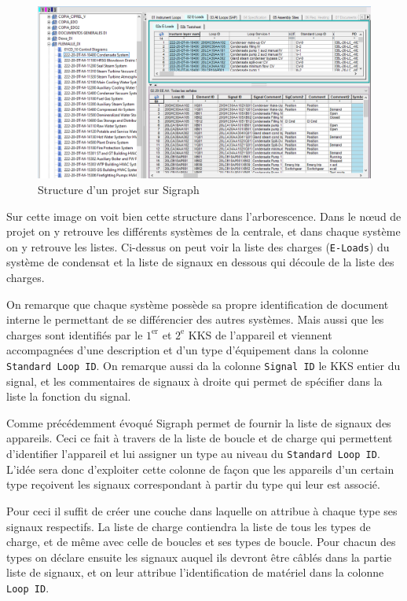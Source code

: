 \documentclass[11pt, openright]{book}
\begin{document}

\begin{figure}[ht!]
    \centering
    \includegraphics[width=\textwidth]{./object/Sigraph.png}
    \caption{Structure d'un projet sur Sigraph}
    \label{fig:Sigraph}
\end{figure}

Sur cette image on voit bien cette structure dans l'arborescence. Dans le nœud de projet on y retrouve les différents systèmes de la centrale, et dans chaque système on y retrouve les listes. Ci-dessus on peut voir la liste des charges (\texttt{E-Loads}) du système de condensat et la liste de signaux en dessous qui découle de la liste des charges.

On remarque que chaque système possède sa propre identification de document interne le permettant de se différencier des autres systèmes. Mais aussi que les charges sont identifiés par le $1^{\text{er}}$ et $2^{\text{e}}$ KKS de l'appareil et viennent accompagnées d'une description et d'un type d'équipement dans la colonne \texttt{Standard Loop ID}. On remarque aussi da la colonne \texttt{Signal ID} le KKS entier du signal, et les commentaires de signaux à droite qui permet de spécifier dans la liste la fonction du signal.

Comme précédemment évoqué Sigraph permet de fournir la liste de signaux des appareils. Ceci ce fait à travers de la liste de boucle et de charge qui permettent d'identifier l'appareil et lui assigner un type au niveau du \texttt{Standard Loop ID}. L'idée sera donc d'exploiter cette colonne de façon que les appareils d'un certain type reçoivent les signaux correspondant à partir du type qui leur est associé.

Pour ceci il suffit de créer une couche dans laquelle on attribue à chaque type ses signaux respectifs. La liste de charge contiendra la liste de tous les types de charge, et de même avec celle de boucles et ses types de boucle. Pour chacun des types on déclare ensuite les signaux auquel ils devront être câblés dans la partie liste de signaux, et on leur attribue l'identification de matériel dans la colonne \texttt{Loop ID}.
\end{document}
